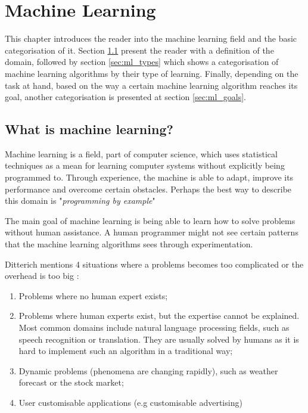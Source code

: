\chapter{Machine Learning}
\label{chap:ml}


This chapter introduces the reader into the machine learning field and the basic categorisation of it. Section \ref{sec:ml_what} present the reader with a definition of the domain, followed by section \ref{sec:ml_types} which shows a categorisation of machine learning algorithms by their type of learning. Finally, depending on the task at hand, based on the way a certain machine learning algorithm reaches its goal, another categorisation is presented at section \ref{sec:ml_goals}.

\section{What is machine learning?}
\label{sec:ml_what}

Machine learning is a field, part of computer science, which uses statistical techniques as a mean for learning computer systems without explicitly being programmed to. Through experience, the machine is able to adapt, improve its performance and overcome certain obstacles. Perhaps the best way to describe this domain is "\textit{programming by example}" \cite{modernapproach}

The main goal of machine learning is being able to learn how to solve problems without human assistance. A human programmer might not see certain patterns that the machine learning algorithms sees through experimentation.

Ditterich mentions 4 situations where a problems becomes too complicated or the overhead is too big \cite{modernapproach}:

\begin{enumerate}
\item{Problems where no human expert exists;}
\item{Problems where human experts exist, but the expertise cannot be explained. Most common domains include natural language processing fields, such as speech recognition or translation. They are usually solved by humans as it is hard to implement such an algorithm in a traditional way;}
\item{Dynamic problems (phenomena are changing rapidly), such as weather forecast or the stock market;}
\item{User customisable applications (e.g customisable advertising)}
\end{enumerate}

